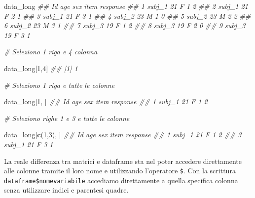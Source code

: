 \documentclass[
]{book}
\newenvironment{Shaded}{\begin{snugshade}}{\end{snugshade}}
\newcommand{\CommentTok}[1]{\textcolor[rgb]{0.56,0.35,0.01}{\textit{#1}}}
\newcommand{\DecValTok}[1]{\textcolor[rgb]{0.00,0.00,0.81}{#1}}
\newcommand{\KeywordTok}[1]{\textcolor[rgb]{0.13,0.29,0.53}{\textbf{#1}}}
\newcommand{\NormalTok}[1]{#1}
\newcommand{\OperatorTok}[1]{\textcolor[rgb]{0.81,0.36,0.00}{\textbf{#1}}}
\begin{document}
\begin{Shaded}
\begin{Highlighting}[]
\NormalTok{data_long}
\CommentTok{##       Id age sex item response}
\CommentTok{## 1 subj_1  21   F    1        2}
\CommentTok{## 2 subj_1  21   F    2        1}
\CommentTok{## 3 subj_1  21   F    3        1}
\CommentTok{## 4 subj_2  23   M    1        0}
\CommentTok{## 5 subj_2  23   M    2        2}
\CommentTok{## 6 subj_2  23   M    3        1}
\CommentTok{## 7 subj_3  19   F    1        2}
\CommentTok{## 8 subj_3  19   F    2        0}
\CommentTok{## 9 subj_3  19   F    3        1}

\CommentTok{# Seleziono 1 riga e 4 colonna}

\NormalTok{data_long[}\DecValTok{1}\NormalTok{,}\DecValTok{4}\NormalTok{]}
\CommentTok{## [1] 1}

\CommentTok{# Seleziono 1 riga e tutte le colonne}

\NormalTok{data_long[}\DecValTok{1}\NormalTok{, ]}
\CommentTok{##       Id age sex item response}
\CommentTok{## 1 subj_1  21   F    1        2}

\CommentTok{# Seleziono righe 1 e 3 e tutte le colonne}

\NormalTok{data_long[}\KeywordTok{c}\NormalTok{(}\DecValTok{1}\NormalTok{,}\DecValTok{3}\NormalTok{), ]}
\CommentTok{##       Id age sex item response}
\CommentTok{## 1 subj_1  21   F    1        2}
\CommentTok{## 3 subj_1  21   F    3        1}
\end{Highlighting}
\end{Shaded}

La reale differenza tra matrici e dataframe sta nel poter accedere direttamente alle colonne tramite il loro nome e utilizzando l'operatore \texttt{\$}. Con la scrittura \texttt{dataframe\$nomevariabile} accediamo direttamente a quella specifica colonna senza utilizzare indici e parentesi quadre.

\begin{Shaded}
\end{Shaded}
\end{document}
